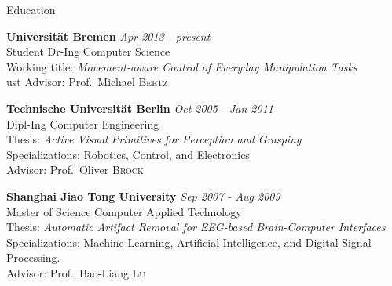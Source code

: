 \documentclass{resume} %
\begin{document}

\begin{rSection}{Education}


{\bf Universit\"at Bremen} \hfill {\em Apr 2013 - present} \\ 
Student Dr-Ing Computer Science \\
Working title: \textit{Movement-aware Control of Everyday Manipulation Tasks}\\ust
Advisor: Prof.~Michael \textsc{Beetz}

{\bf Technische Universit\"at Berlin} \hfill {\em Oct 2005 - Jan 2011}\\
Dipl-Ing Computer Engineering\\
Thesis: \textit{Active Visual Primitives for Perception and Grasping}\\
Specializations: Robotics, Control, and Electronics\\
Advisor: Prof.~Oliver \textsc{Brock}


{\bf Shanghai Jiao Tong University} \hfill {\em Sep 2007 - Aug 2009}\\
Master of Science Computer Applied Technology\\
Thesis: \textit{Automatic Artifact Removal for EEG-based Brain-Computer Interfaces}\\
Specializations: Machine Learning, Artificial Intelligence, and Digital Signal Processing.\\
Advisor: Prof.~Bao-Liang \textsc{Lu}

\end{rSection}

\end{document}
